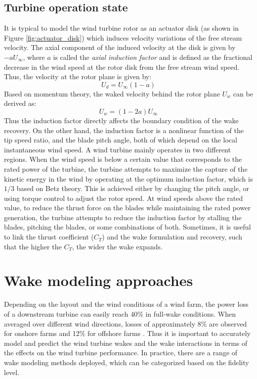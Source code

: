 \documentclass{umthesis}
\begin{document}
\subsection{Turbine operation state}
It is typical to model the wind turbine rotor as an actuator disk (as shown in Figure \ref{fig:actuator_disk}) which induces velocity variations of the free stream velocity. The axial component of the induced velocity at the disk is given by $-aU_\infty$, where $a$ is called the \textit{axial induction factor} and is defined as the fractional decrease in the wind speed at the rotor disk from the free stream wind speed. Thus, the velocity at the rotor plane is given by:
\begin{equation}
 U_d=U_\infty(1-a)
\end{equation}
Based on momentum theory, the waked velocity behind the rotor plane $U_w$ can be derived as:
\begin{equation}
 U_w=(1-2a)U_\infty
\end{equation}
Thus the induction factor directly affects the boundary condition of the wake recovery. On the other hand, the induction factor is a nonlinear function of the tip speed ratio, and the blade pitch angle, both of which depend on the local instantaneous wind speed. A wind turbine mainly operates in two different regions. When the wind speed is below a certain value that corresponds to the rated power of the turbine, the turbine attempts to maximize the capture of the kinetic energy in the wind by operating at the optimum induction factor, which is $1/3$ based on Betz theory. This is achieved either by changing the pitch angle, or using torque control to adjust the rotor speed. At wind speeds above the rated value, to reduce the thrust force on the blades while maintaining the rated power generation, the turbine attempts to reduce the induction factor by stalling the blades, pitching the blades, or some combinations of both. Sometimes, it is useful to link the thrust coefficient ($C_T$) and the wake formulation and recovery, such that the higher the $C_T$, the wider the wake expands.



\section{Wake modeling approaches}
Depending on the layout and the wind conditions of a wind farm, the power loss of a downstream turbine can easily reach 40\% in full-wake conditions. When averaged over different wind directions, losses of approximately 8\% are observed for onshore farms and 12\% for offshore farms \cite{Barthelmie_2008}. Thus it is important to accurately model and predict the wind turbine wakes and the wake interactions in terms of the effects on the wind turbine performance. In practice, there are a range of wake modeling methods deployed, which can be categorized based on the fidelity level.
\end{document}
